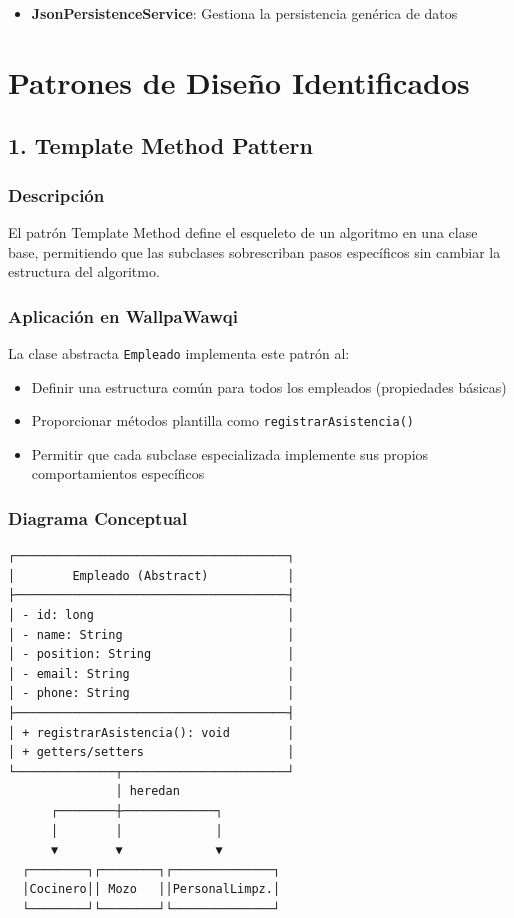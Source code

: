 \documentclass[12pt, a4paper]{report}
\begin{document}
\begin{itemize}
    \item \textbf{JsonPersistenceService}: Gestiona la persistencia genérica de datos
\end{itemize}

\newpage

\chapter{Patrones de Diseño Identificados}

\section{1. Template Method Pattern}

\subsection{Descripción}

El patrón Template Method define el esqueleto de un algoritmo en una clase base, permitiendo que las subclases sobrescriban pasos específicos sin cambiar la estructura del algoritmo.

\subsection{Aplicación en WallpaWawqi}

La clase abstracta \texttt{Empleado} implementa este patrón al:

\begin{itemize}
    \item Definir una estructura común para todos los empleados (propiedades básicas)
    \item Proporcionar métodos plantilla como \texttt{registrarAsistencia()}
    \item Permitir que cada subclase especializada implemente sus propios comportamientos específicos
\end{itemize}

\subsection{Diagrama Conceptual}

\begin{verbatim}
┌──────────────────────────────────────┐
│        Empleado (Abstract)           │
├──────────────────────────────────────┤
│ - id: long                           │
│ - name: String                       │
│ - position: String                   │
│ - email: String                      │
│ - phone: String                      │
├──────────────────────────────────────┤
│ + registrarAsistencia(): void        │
│ + getters/setters                    │
└──────────────┬───────────────────────┘
               │ heredan
      ┌────────┼─────────────┐
      │        │             │
      ▼        ▼             ▼
  ┌────────┐┌────────┐┌──────────────┐
  │Cocinero││ Mozo   ││PersonalLimpz.│
  └────────┘└────────┘└──────────────┘
\end{verbatim}
\end{document}
